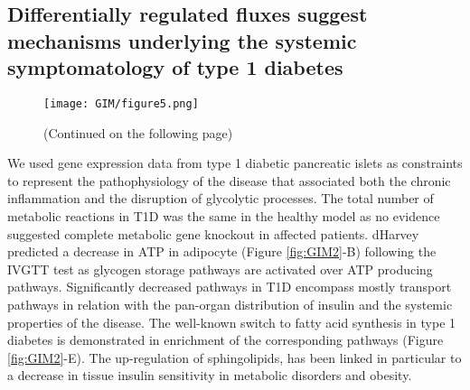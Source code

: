 \subsection{Differentially regulated fluxes suggest mechanisms underlying the systemic symptomatology of type 1 diabetes}
\begin{figure}[!htp]
\centering
	\texttt{[image: GIM/figure5.png]}%
	\caption[Intra-individual variability to insulin response.]{(Continued on the following page)}
	\label{fig:GIM5}
\end{figure}
\begin{figure}[t]
\end{figure}
We used gene expression data from type 1 diabetic pancreatic islets as constraints to represent the pathophysiology of the disease that associated both the chronic inflammation and the disruption of glycolytic processes. The total number of metabolic reactions in T1D was the same in the healthy model as no evidence suggested complete metabolic gene knockout in affected patients. dHarvey predicted a decrease in ATP in adipocyte (Figure \ref{fig:GIM2}-B) following the IVGTT test as glycogen storage pathways are activated over ATP producing pathways. 
Significantly  decreased pathways in T1D encompass mostly transport pathways in relation with the pan-organ distribution of insulin and the systemic properties of the disease. The well-known switch to fatty acid synthesis in type 1 diabetes is demonstrated in enrichment of the corresponding pathways (Figure \ref{fig:GIM2}-E). The up-regulation of sphingolipids, has been linked in particular to a decrease in tissue insulin sensitivity \cite{russo2013sphingolipids} in metabolic disorders and obesity.\\

